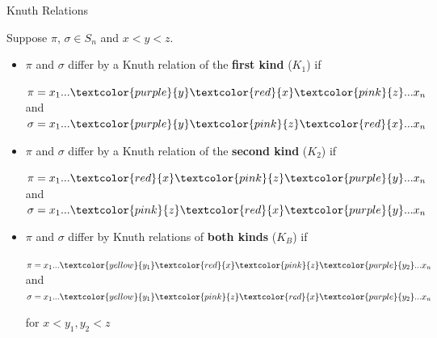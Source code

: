\documentclass[aspectratio=169, serif]{beamer}
\begin{document}
\begin{frame}{Knuth Relations}
    \begin{definition}
        Suppose $\pi$, $\sigma \in S_n$ and $x<y<z$.
            \begin{itemize}
                \item $\pi$ and $\sigma$ differ by a Knuth relation of the \textbf{first kind} ($K_1$) if \begin{center} $\pi=x_1...\textcolor{purple}{y}\textcolor{red}{x}\textcolor{pink}{z}...x_n$ and $\sigma=x_1...\textcolor{purple}{y}\textcolor{pink}{z}\textcolor{red}{x}...x_n$ \end{center} 
                
                \item $\pi$ and $\sigma$ differ by a Knuth relation of the \textbf{second kind} ($K_2$) if \begin{center} $\pi=x_1...\textcolor{red}{x}\textcolor{pink}{z}\textcolor{purple}{y}...x_n$ and $\sigma=x_1...\textcolor{pink}{z}\textcolor{red}{x}\textcolor{purple}{y}...x_n$ \end{center}  
                
                \item $\pi$ and $\sigma$ differ by Knuth relations of \textbf{both kinds} ($K_B$) if
                \begin{center} $\pi=x_1...\textcolor{yellow}{y_1}\textcolor{red}{x}\textcolor{pink}{z}\textcolor{purple}{y_2}...x_n$ and $\sigma=x_1...\textcolor{yellow}{y_1}\textcolor{pink}{z}\textcolor{red}{x}\textcolor{purple}{y_2}...x_n$ \end{center}for $x<y_1,y_2<z$
            \end{itemize}
    \end{definition}
\end{frame}
\end{document}
